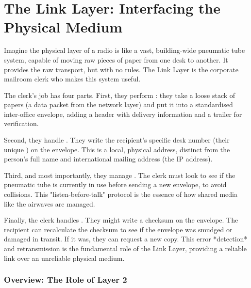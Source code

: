 
\chapter{The Link Layer: Interfacing the Physical Medium}
\label{ch:link-layer}

\begin{nontechnical}
    Imagine the physical layer of a radio is like a vast, building-wide pneumatic tube system, capable of moving raw pieces of paper from one desk to another. It provides the raw transport, but with no rules. The Link Layer is the corporate mailroom clerk who makes this system useful.

    The clerk's job has four parts. First, they perform : they take a loose stack of papers (a data packet from the network layer) and put it into a standardised inter-office envelope, adding a header with delivery information and a trailer for verification.

    Second, they handle . They write the recipient's specific desk number (their unique ) on the envelope. This is a local, physical address, distinct from the person's full name and international mailing address (the IP address).

    Third, and most importantly, they manage . The clerk must look to see if the pneumatic tube is currently in use before sending a new envelope, to avoid collisions. This "listen-before-talk" protocol is the essence of how shared media like the airwaves are managed.

    Finally, the clerk handles . They might write a checksum on the envelope. The recipient can recalculate the checksum to see if the envelope was smudged or damaged in transit. If it was, they can request a new copy. This error *detection* and retransmission is the fundamental role of the Link Layer, providing a reliable link over an unreliable physical medium.
\end{nontechnical}

\subsection{Overview: The Role of Layer 2}

